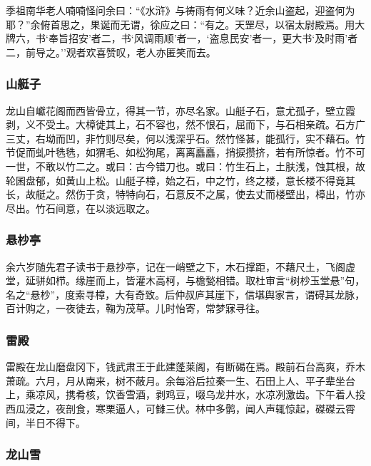 \documentclass[]{article}
\begin{document}
季祖南华老人喃喃怪问余曰：``《水浒》与祷雨有何义味？近余山盗起，迎盗何为耶？''余俯首思之，果诞而无谓，徐应之曰：``有之。天罡尽，以宿太尉殿焉。用大牌六，书`奉旨招安'者二，书`风调雨顺'者一，`盗息民安'者一，更大书`及时雨'者二，前导之。''观者欢喜赞叹，老人亦匿笑而去。

\hypertarget{header-n535}{%
\subsubsection{山艇子}\label{header-n535}}

龙山自巘花阁而西皆骨立，得其一节，亦尽名家。山艇子石，意尤孤孑，壁立霞剥，义不受土。大樟徙其上，石不容也，然不恨石，屈而下，与石相亲疏。石方广三丈，右坳而凹，非竹则尽矣，何以浅深乎石。然竹怪甚，能孤行，实不藉石。竹节促而虬叶毨毨，如猬毛、如松狗尾，离离矗矗，捎捩攒挤，若有所惊者。竹不可一世，不敢以竹二之。或曰：古今错刀也。或曰：竹生石上，土肤浅，蚀其根，故轮囷盘郁，如黄山上松。山艇子樟，始之石，中之竹，终之楼，意长楼不得竟其长，故艇之。然伤于贪，特特向石，石意反不之属，使去丈而楼壁出，樟出，竹亦尽出。竹石间意，在以淡远取之。

\hypertarget{header-n540}{%
\subsubsection{悬杪亭}\label{header-n540}}

余六岁随先君子读书于悬抄亭，记在一峭壁之下，木石撑距，不藉尺土，飞阁虚堂，延骈如栉。缘崖而上，皆灌木高柯，与檐甃相错。取杜审言``树杪玉堂悬''句，名之``悬杪''，度索寻樟，大有奇致。后仲叔庐其崖下，信堪舆家言，谓碍其龙脉，百计购之，一夜徒去，鞠为茂草。儿时怡寄，常梦寐寻往。

\hypertarget{header-n545}{%
\subsubsection{雷殿}\label{header-n545}}

雷殿在龙山磨盘冈下，钱武肃王于此建蓬莱阁，有断碣在焉。殿前石台高爽，乔木萧疏。六月，月从南来，树不蔽月。余每浴后拉秦一生、石田上人、平子辈坐台上，乘凉风，携肴核，饮香雪酒，剥鸡豆，啜乌龙井水，水凉冽激齿。下午着人投西瓜浸之，夜剖食，寒栗逼人，可雠三伏。林中多鹘，闻人声辄惊起，磔磔云霄间，半日不得下。

\hypertarget{header-n550}{%
\subsubsection{龙山雪}\label{header-n550}}
\end{document}
